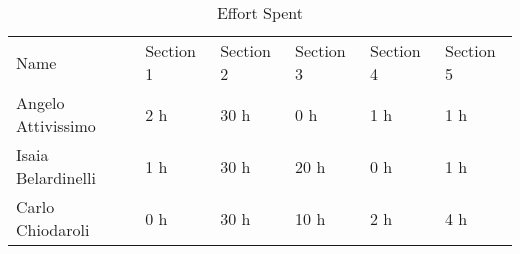 \begin{table}[H]
\begin{center}
    \begin{tabu}{|X[1.5]|X|X|X|X|X|} \hline \everyrow{\hline}
        Name & Section 1 & Section 2 & Section 3 & Section 4 & Section 5\\ 
        Angelo Attivissimo & 2 h &  30 h & 0 h & 1 h & 1 h\\
        Isaia Belardinelli & 1 h & 30 h & 20 h & 0 h & 1 h\\
        Carlo Chiodaroli & 0 h & 30 h & 10 h & 2 h & 4 h\\ 
    \end{tabu}
\end{center}
\caption{Effort Spent}
\end{table}